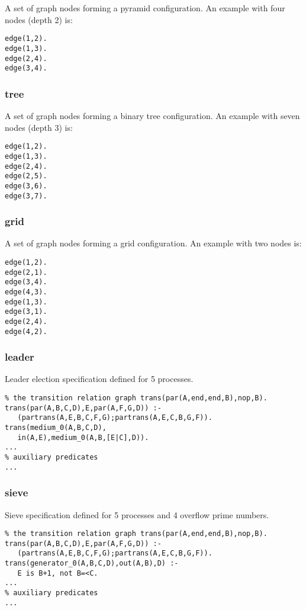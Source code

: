 A set of graph nodes forming a pyramid configuration.
An example with four nodes (depth 2) is:

\begin{Verbatim}
edge(1,2).
edge(1,3).
edge(2,4).
edge(3,4).
\end{Verbatim}

\subsubsection*{tree}

A set of graph nodes forming a binary tree configuration.
An example with seven nodes (depth 3) is:

\begin{Verbatim}
edge(1,2).
edge(1,3).
edge(2,4).
edge(2,5).
edge(3,6).
edge(3,7).
\end{Verbatim}

\subsubsection*{grid}

A set of graph nodes forming a grid configuration.
An example with two nodes is:

\begin{Verbatim}
edge(1,2).
edge(2,1).
edge(3,4).
edge(4,3).
edge(1,3).
edge(3,1).
edge(2,4).
edge(4,2).
\end{Verbatim}

\subsubsection*{leader}

Leader election specification defined for 5 processes.

\begin{Verbatim}
% the transition relation graph trans(par(A,end,end,B),nop,B).
trans(par(A,B,C,D),E,par(A,F,G,D)) :-
   (partrans(A,E,B,C,F,G);partrans(A,E,C,B,G,F)).
trans(medium_0(A,B,C,D),
   in(A,E),medium_0(A,B,[E|C],D)).
...
% auxiliary predicates
...
\end{Verbatim}

\subsubsection*{sieve}

Sieve specification defined for 5 processes and 4 overflow prime numbers.

\begin{Verbatim}
% the transition relation graph trans(par(A,end,end,B),nop,B).
trans(par(A,B,C,D),E,par(A,F,G,D)) :-
   (partrans(A,E,B,C,F,G);partrans(A,E,C,B,G,F)).
trans(generator_0(A,B,C,D),out(A,B),D) :-
   E is B+1, not B=<C.
...
% auxiliary predicates
...
\end{Verbatim}

